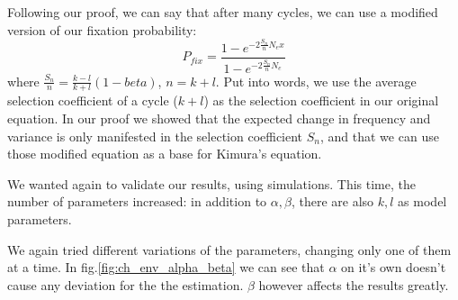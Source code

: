 \documentclass[11pt]{article}
\begin{document}
Following our proof, we can say that after many cycles, we can use a modified version of our fixation probability:
\begin{equation}
P_{fix} = \frac{1-e^{-2 \frac{S_n}{n} N_e x}}{1-e^{-2 \frac{S_n}{n} N_e}}
\end{equation}
where $\frac{S_n}{n} = \frac{k-l}{k+l}(1-beta)$, $n=k+l$. Put into words, we use the average selection coefficient of a cycle ($k+l$) as the selection coefficient in our original equation.
In our proof we showed that the expected change in frequency and variance is only manifested in the selection coefficient $S_n$, and that we can use those modified equation as a base for Kimura's equation.

We wanted again to validate our results, using simulations.
This time, the number of parameters increased: in addition to $\alpha,\beta$, there are also $k,l$ as model parameters.

We again tried different variations of the parameters, changing only one of them at a time.
In fig.\ref{fig:ch_env_alpha_beta} we can see that $\alpha$ on it's own doesn't cause any deviation for the the estimation. $\beta$ however affects the results greatly.
\end{document}
